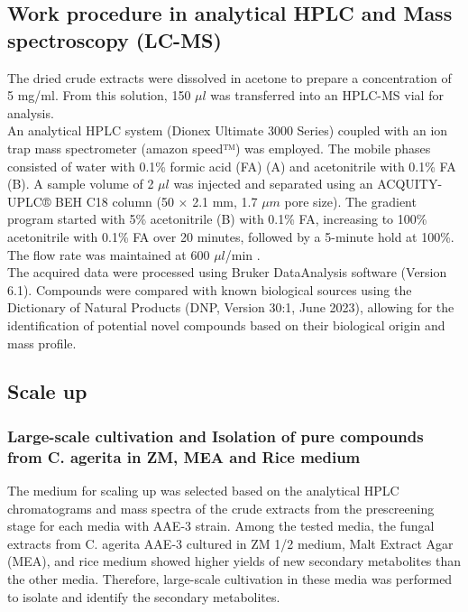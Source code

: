 \subsection{Work procedure in analytical HPLC and Mass spectroscopy (LC-MS)} \label{lc-ms}
The dried crude extracts were dissolved in acetone  to prepare a concentration of  5 mg/ml. From this solution, 150 $\mu l$ was transferred into an HPLC-MS vial for analysis.\\

 An analytical HPLC system (Dionex Ultimate 3000 Series) coupled with an ion trap mass spectrometer (amazon speed™) was employed. The mobile phases consisted of water with 0.1\% formic acid (FA) (A) and acetonitrile with 0.1\% FA (B). A sample volume of 2 $\mu l$ was injected and separated using an ACQUITY-UPLC® BEH C18 column (50 × 2.1 mm, 1.7 $\mu m$ pore size). The gradient program started with 5\% acetonitrile (B) with 0.1\% FA, increasing to 100\% acetonitrile with 0.1\% FA over 20 minutes, followed by a 5-minute hold at 100\%. The flow rate was maintained at 600 $\mu l$/min \cite{Harms2021}.\\
 
The acquired data were processed using Bruker DataAnalysis software (Version 6.1). Compounds were compared with known biological sources using the Dictionary of Natural Products (DNP, Version 30:1, June 2023), allowing for the identification of potential novel compounds based on their biological origin and mass profile.\\


\subsection{Scale up}
\subsubsection{Large-scale cultivation and Isolation of pure compounds from C. agerita  in ZM, MEA and Rice medium}

The medium for scaling up was selected based on the analytical HPLC chromatograms and mass spectra of the crude extracts from the prescreening stage for each media with AAE-3 strain. Among the tested media, the fungal extracts from C. agerita AAE-3 cultured in ZM 1/2 medium, Malt Extract Agar (MEA), and rice medium showed higher yields of  new secondary metabolites than the other media. Therefore, large-scale cultivation in these media was performed to isolate and identify the secondary metabolites.\\

